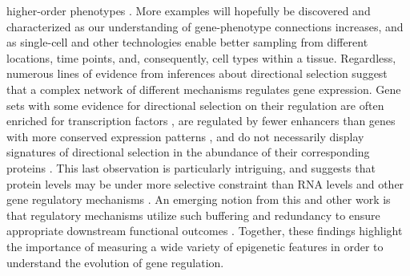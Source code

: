 {higher-order phenotypes \cite{Babbitt et al 2010 (Multiple functional variantsin cis modulate PDYN expression), Warner et al. 2009 (Functional consequences of genetic variation in primates on tyrosine hydroxylase (TH) expression in vivo)}. More examples will hopefully be discovered and characterized as our understanding of gene-phenotype connections increases, and as single-cell and other technologies enable better sampling from different locations, time points, and, consequently, cell types within a tissue. Regardless, numerous lines of evidence from inferences about directional selection suggest that a complex network of different mechanisms regulates gene expression. Gene sets with some evidence for directional selection on their regulation are often enriched for transcription factors \cite{Blekhman et al 2008, Gilad et al. 2006 (Expression profiling in primates revels a rapid evolution of human transcription factors)}, are regulated by fewer enhancers than genes with more conserved expression patterns \cite{Danko et al 2018 (Dynamic evolution of regulatory element ensembles in primate CD4+ T cells), Berthelot et al. 2018 (Complexity and conservation of regulatory landscapes underlie evolutionary resilience of...)}, and do not necessarily display signatures of directional selection in the abundance of their corresponding proteins \cite{Khan et al 2013 (Primate transcript and protein expression levels evolve under compensatory selection pressures)}. This last observation is particularly intriguing, and suggests that protein levels may be under more selective constraint than RNA levels and other gene regulatory mechanisms \cite{Wang et al 2018 (Post-translational buffering leads to convergent protein expression levels between primates), Anderson Vigalys and Tung 2020 (Broadening primate genomics: new insights into the ecology and evolution of primate gene regulation)}. An emerging notion from this and other work is that regulatory mechanisms utilize such buffering and redundancy to ensure appropriate downstream functional outcomes \cite{MacNeil and Walhout 2011 (Gene regulatory networks and the role of robustness and stochasticity in the control of gene expression)}. Together, these findings highlight the importance of measuring a wide variety of epigenetic features in order to understand the evolution of gene regulation.

}
